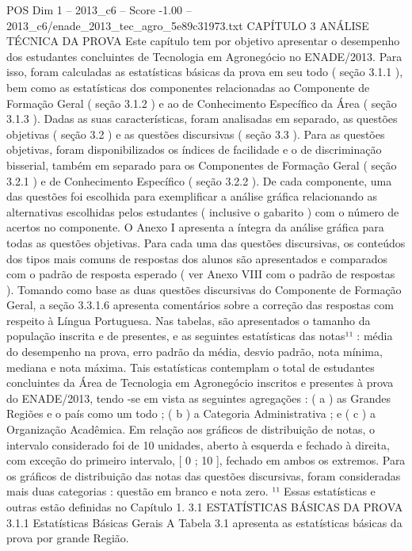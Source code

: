 \begin{textsample}{POS Dim 1 – 2013\_c6 – Score -1.00 – 2013\_c6/enade\_2013\_tec\_agro\_5e89c31973.txt}  \label{ex:f1_pos_176}
CAPÍTULO 3 ANÁLISE TÉCNICA DA PROVA Este capítulo tem por objetivo apresentar o desempenho dos estudantes concluintes de Tecnologia em Agronegócio no ENADE/2013.
Para isso, foram calculadas as estatísticas básicas da prova em seu todo ( seção 3.1.1 ), bem como as estatísticas dos componentes relacionadas ao Componente de Formação Geral ( seção 3.1.2 ) e ao de Conhecimento Específico da Área ( seção 3.1.3 ).
Dadas as suas características, foram analisadas em separado, as questões objetivas ( seção 3.2 ) e as questões discursivas ( seção 3.3 ).
Para as questões objetivas, foram disponibilizados os índices de facilidade e o de discriminação bisserial, também em separado para os Componentes de Formação Geral ( seção 3.2.1 ) e de Conhecimento Específico ( seção 3.2.2 ).
De cada componente, uma das questões foi escolhida para exemplificar a análise gráfica relacionando as alternativas escolhidas pelos estudantes ( inclusive o gabarito ) com o número de acertos no componente.
O Anexo I apresenta a íntegra da análise gráfica para todas as questões objetivas.
Para cada uma das questões discursivas, os conteúdos dos tipos mais comuns de respostas dos alunos são apresentados e comparados com o padrão de resposta esperado ( ver Anexo VIII com o padrão de respostas ).
Tomando como base as duas questões discursivas do Componente de Formação Geral, a seção 3.3.1.6 apresenta comentários sobre a correção das respostas com respeito à Língua Portuguesa.
Nas tabelas, são apresentados o tamanho da população inscrita e de presentes, e as seguintes estatísticas das notas¹¹ : média do desempenho na prova, erro padrão da média, desvio padrão, nota mínima, mediana e nota máxima.
Tais estatísticas contemplam o total de estudantes concluintes da Área de Tecnologia em Agronegócio inscritos e presentes à prova do ENADE/2013, tendo -se em vista as seguintes agregações : ( a ) as Grandes Regiões e o país como um todo ; ( b ) a Categoria Administrativa ; e ( c ) a Organização Acadêmica.
Em relação aos gráficos de distribuição de notas, o intervalo considerado foi de 10 unidades, aberto à esquerda e fechado à direita, com exceção do primeiro intervalo, [ 0 ; 10 ], fechado em ambos os extremos.
Para os gráficos de distribuição das notas das questões discursivas, foram consideradas mais duas categorias : questão em branco e nota zero. ¹¹ Essas estatísticas e outras estão definidas no Capítulo 1. 3.1 ESTATÍSTICAS BÁSICAS DA PROVA 3.1.1 Estatísticas Básicas Gerais A Tabela 3.1 apresenta as estatísticas básicas da prova por grande Região.

\end{textsample}

